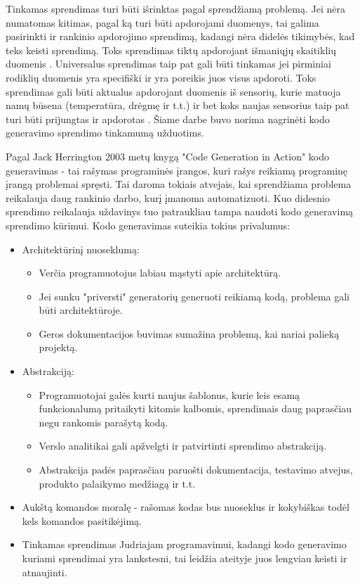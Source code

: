 \documentclass{VUMIFPSbakalaurinis}
\begin{document}
Tinkamas sprendimas turi būti išrinktas pagal sprendžiamą problemą. Jei nėra numatomas kitimas, pagal ką turi būti apdorojami duomenys, tai galima pasirinkti ir rankinio apdorojimo sprendimą, kadangi nėra didelės tikimybės, kad teks keisti sprendimą. Toks sprendimas tiktų apdorojant išmaniųjų skaitiklių duomenis \cite{skaitikliai}. Universalus sprendimas taip pat gali būti tinkamas jei pirminiai rodiklių duomenis yra specifiški ir yra poreikis juos visus apdoroti. Toks sprendimas gali būti aktualus apdorojant duomenis iš sensorių, kurie matuoja namų būsena (temperatūra, drėgmę ir t.t.) ir bet koks naujas sensorius taip pat turi būti prijungtas ir apdorotas \cite{yang2017iot}. Šiame darbe buvo norima nagrinėti kodo generavimo sprendimo tinkamumą užduotims. \par
Pagal Jack Herrington 2003 metų knygą "Code Generation in Action" kodo generavimas - tai rašymas programinės įrangos, kuri rašys reikiamą programinę įrangą problemai spręsti. Tai daroma tokiais atvejais, kai sprendžiama problema reikalauja daug rankinio darbo, kurį įmanoma automatizuoti. Kuo didesnio sprendimo reikalauja uždavinys tuo patraukliau tampa naudoti kodo generavimą sprendimo kūrimui. Kodo generavimas suteikia tokius privalumus: 
\begin{itemize}
    \item Architektūrinį nuoseklumą: 
    \begin{itemize}
        \item Verčia programuotojus labiau mąstyti apie architektūrą.
        \item Jei sunku "priversti" generatorių generuoti reikiamą kodą, problema gali būti architektūroje.
        \item Geros dokumentacijos buvimas sumažina problemą, kai nariai palieką projektą.
    \end{itemize}
    \item Abstrakciją:
    \begin{itemize}
        \item Programuotojai galės kurti naujus šablonus, kurie leis esamą funkcionalumą pritaikyti kitomis kalbomis, sprendimais daug paprasčiau negu rankomis parašytą kodą.
        \item Verslo analitikai gali apžvelgti ir patvirtinti sprendimo abstrakciją.
        \item Abstrakcija padės paprasčiau paruošti dokumentacija, testavimo atvejus, produkto palaikymo medžiagą ir t.t.  
    \end{itemize}
    \item Aukštą komandos moralę - rašomas kodas bus nuoseklus ir kokybiškas todėl kels komandos pasitikėjimą.
    \item Tinkamas sprendimas Judriajam programavimui, kadangi kodo generavimo kuriami sprendimai yra lankstesni, tai leidžia ateityje juos lengviau keisti ir atnaujinti.   
\end{itemize} 
\end{document}

